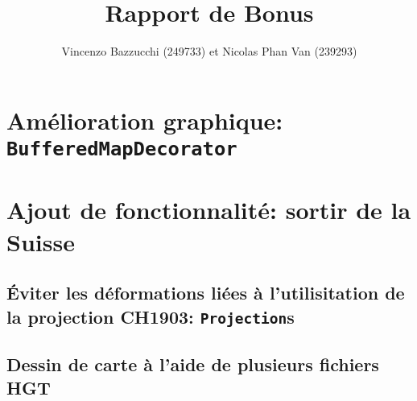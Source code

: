 \documentclass[11pt,a4paper]{article}
\author{Vincenzo Bazzucchi (249733) et Nicolas Phan Van (239293)}
\title{Rapport de Bonus}
\date{}
\begin{document}
\maketitle

\section{Amélioration graphique: \texttt{BufferedMapDecorator}}

\section{Ajout de fonctionnalité: sortir de la Suisse}
\subsection{Éviter les déformations liées à l'utilisitation de la projection CH1903: \texttt{Projection}s}
\subsection{Dessin de carte à l'aide de plusieurs fichiers HGT}
\end{document}
